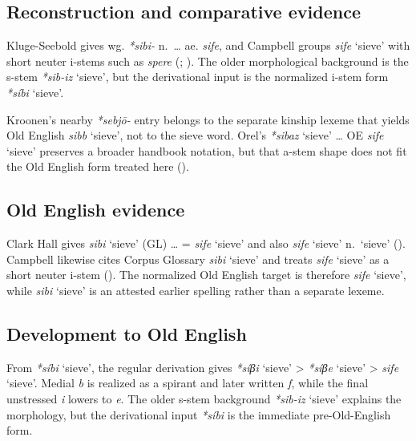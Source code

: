\documentclass[
  british,
  a4paper,
  openany]{book}
\providecommand{\Recon}[1]{\emph{*#1}}
{\catcode`→=\active \global\def→{\ensuremath{\rightarrow}}}
\providecommand{\Recon}[1]{\emph{*#1}}
{\catcode`→=\active \global\def→{\ensuremath{\rightarrow}}}
\begin{document}
\subsection{Reconstruction and comparative
evidence}\label{reconstruction-and-comparative-evidence-95}

Kluge-Seebold gives wg. \emph{*sibi-} n.~\ldots{} ae. \emph{sife}, and
Campbell groups {\emph{sife}} `sieve' with short neuter i-stems such as
\emph{spere} (;
). The older
morphological background is the s-stem \Recon{sib-iz} `sieve', but the
derivational input is the normalized i-stem form {\Recon{síbi} `sieve'}.

Kroonen's nearby \emph{*sebjō-} entry belongs to the separate kinship
lexeme that yields Old English {\emph{sibb}} `sieve', not to the sieve
word. Orel's {\Recon{sibaz} `sieve'} \ldots{} OE {\emph{sife}} `sieve'
preserves a broader handbook notation, but that a-stem shape does not
fit the Old English form treated here ().

\subsection{Old English evidence}\label{old-english-evidence-95}

Clark Hall gives {\emph{sibi}} `sieve' (GL) \ldots{} = {\emph{sife}}
`sieve' and also {\emph{sife}} `sieve' n.~`sieve'
(). Campbell likewise
cites Corpus Glossary \emph{sibi} `sieve' and treats \emph{sife} `sieve'
as a short neuter i-stem (). The normalized Old English target is therefore
\emph{sife} `sieve', while \emph{sibi} `sieve' is an attested earlier
spelling rather than a separate lexeme.

\subsection{Development to Old
English}\label{development-to-old-english-95}

From {\Recon{síbi} `sieve'}, the regular derivation gives \Recon{síβi}
`sieve' \textgreater{} \Recon{síβe} `sieve' \textgreater{} {\emph{sife}}
`sieve'. Medial \emph{b} is realized as a spirant and later written
\emph{f}, while the final unstressed \emph{i} lowers to \emph{e}. The
older s-stem background \Recon{sib-iz} `sieve' explains the morphology,
but the derivational input {\Recon{síbi}} is the immediate
pre-Old-English form.
\end{document}
